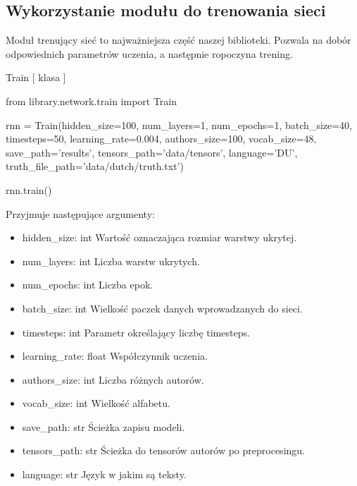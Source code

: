 \newpage
\subsection{Wykorzystanie modułu do trenowania sieci}
Moduł trenujący sieć to najważniejsza część naszej biblioteki. Pozwala na dobór odpowiednich parametrów uczenia,
a następnie ropoczyna trening.

\myspace
{}
\myspace

\item{Train [ klasa ]}
\begin{import}
from library.network.train import Train

rnn = Train(hidden_size=100,
            num_layers=1,
            num_epochs=1,
            batch_size=40,
            timesteps=50,
            learning_rate=0.004,
            authors_size=100,
            vocab_size=48,
            save_path='results',
            tensors_path='data/tensors',
            language='DU',
            truth_file_path='data/dutch/truth.txt')
            
rnn.train()
\end{import}

Przyjmuje następujące argumenty:
\begin{itemize}
	\item hidden\_size: int
		\newline Wartość oznaczająca rozmiar warstwy ukrytej.
	\item num\_layers: int
		\newline Liczba warstw ukrytych.
	\item num\_epochs: int
		\newline Liczba epok.
	\item batch\_size: int
		\newline Wielkość paczek danych wprowadzanych do sieci.
	\item timesteps: int
		\newline Parametr określający liczbę timesteps.
	\item learning\_rate: float
		\newline Współczynnik uczenia.
	\item authors\_size: int
		\newline Liczba różnych autorów.
	\item vocab\_size: int
		\newline Wielkość alfabetu.
	\item save\_path: str
		\newline Ścieżka zapisu modeli.
	\item tensors\_path: str
		\newline Ścieżka do tensorów autorów po preprocesingu.
	\item language: str
		\newline Język w jakim są teksty.
		
\end{itemize}

